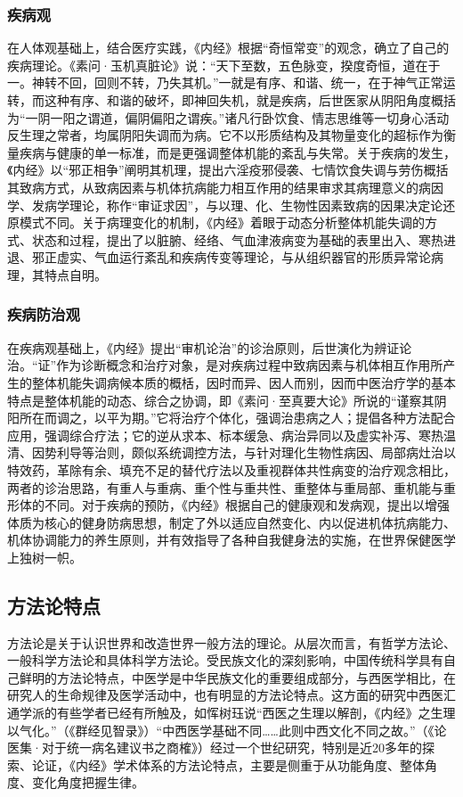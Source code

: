 \documentclass[draft,12pt]{ctexbook}
\begin{document}
\subsubsection{疾病观}%

在人体观基础上，结合医疗实践，《内经》根据“奇恒常变”的观念，确立了自己的疾病理论。《素问·玉机真脏论》说：“天下至数，五色脉变，揆度奇恒，道在于一。神转不回，回则不转，乃失其机。”一就是有序、和谐、统一，在于神气正常运转，而这种有序、和谐的破坏，即神回失机，就是疾病，后世医家从阴阳角度概括为“一阴一阳之谓道，偏阴偏阳之谓疾。”诸凡行卧饮食、情志思维等一切身心活动反生理之常者，均属阴阳失调而为病。它不以形质结构及其物量变化的超标作为衡量疾病与健康的单一标准，而是更强调整体机能的紊乱与失常。关于疾病的发生，《内经》以“邪正相争”阐明其机理，提出六淫疫邪侵袭、七情饮食失调与劳伤概括其致病方式，从致病因素与机体抗病能力相互作用的结果审求其病理意义的病因学、发病学理论，称作“审证求因”，与以理、化、生物性因素致病的因果决定论还原模式不同。关于病理变化的机制，《内经》着眼于动态分析整体机能失调的方式、状态和过程，提出了以脏腑、经络、气血津液病变为基础的表里出入、寒热进退、邪正虚实、气血运行紊乱和疾病传变等理论，与从组织器官的形质异常论病理，其特点自明。

\subsubsection{疾病防治观}%

在疾病观基础上，《内经》提出“审机论治”的诊治原则，后世演化为辨证论治。“证”作为诊断概念和治疗对象，是对疾病过程中致病因素与机体相互作用所产生的整体机能失调病候本质的概栝，因时而异、因人而别，因而中医治疗学的基本特点是整体机能的动态、综合之协调，即《素问·至真要大论》所说的“谨察其阴阳所在而调之，以平为期。”它将治疗个体化，强调治患病之人；提倡各种方法配合应用，强调综合疗法；它的逆从求本、标本缓急、病治异同以及虚实补泻、寒热温清、因势利导等治则，颇似系统调控方法，与针对理化生物性病因、局部病灶治以特效药，革除有余、填充不足的替代疗法以及重视群体共性病变的治疗观念相比，两者的诊治思路，有重人与重病、重个性与重共性、重整体与重局部、重机能与重形体的不同。对于疾病的预防，《内经》根据自己的健康观和发病观，提出以增强体质为核心的健身防病思想，制定了外以适应自然变化、内以促进机体抗病能力、机体协调能力的养生原则，并有效指导了各种自我健身法的实施，在世界保健医学上独树一帜。

\subsection{方法论特点} %

方法论是关于认识世界和改造世界一般方法的理论。从层次而言，有哲学方法论、一般科学方法论和具体科学方法论。受民族文化的深刻影响，中国传统科学具有自己鲜明的方法论特点，中医学是中华民族文化的重要组成部分，与西医学相比，在研究人的生命规律及医学活动中，也有明显的方法论特点。这方面的研究中西医汇通学派的有些学者已经有所触及，如恽树珏说“西医之生理以解剖，《内经》之生理以气化。”（《群经见智录》）“中西医学基础不同……此则中西文化不同之故。”（《论医集·对于统一病名建议书之商榷》）经过一个世纪研究，特别是近20多年的探索、论证，《内经》学术体系的方法论特点，主要是侧重于从功能角度、整体角度、变化角度把握生律。
\end{document}
